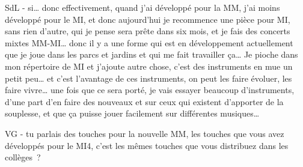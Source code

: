 SdL - si… donc effectivement, quand j'ai développé pour la MM, j'ai moins développé pour le MI, et donc aujourd'hui je recommence une pièce pour MI, sans rien d'autre, qui je pense sera prête dans six mois, et je fais des concerts mixtes MM-MI… donc il y a une forme qui est en développement actuellement que je joue dans les parcs et jardins et qui me fait travailler ça… Je pioche dans mon répertoire de MI et j'ajoute autre chose, c'est des instruments en mue un petit peu… et c'est l'avantage de ces instruments, on peut les faire évoluer, les faire vivre… une fois que ce sera porté, je vais essayer beaucoup d'instruments, d'une part d'en faire des nouveaux et sur ceux qui existent d'apporter de la souplesse, et que ça puisse jouer facilement sur différentes musiques… 

VG - tu parlais des touches pour la nouvelle MM, les touches que vous avez développés pour le MI4, c'est les mêmes touches que vous distribuez dans les collèges ? 


